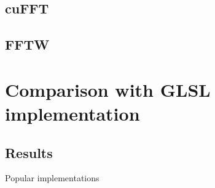\documentclass[
  oneside,
  11pt, a4paper,
  footinclude=true,
  headinclude=true,
  cleardoublepage=empty
]{scrbook}
\begin{document}
\subsection{cuFFT}
\subsection{FFTW}
\section{Comparison with GLSL implementation}
\subsection{Results}
Popular implementations


\cleardoublepage



\printindex

    
    \appendix
    \renewcommand\chaptername{Appendix}






\end{document}
